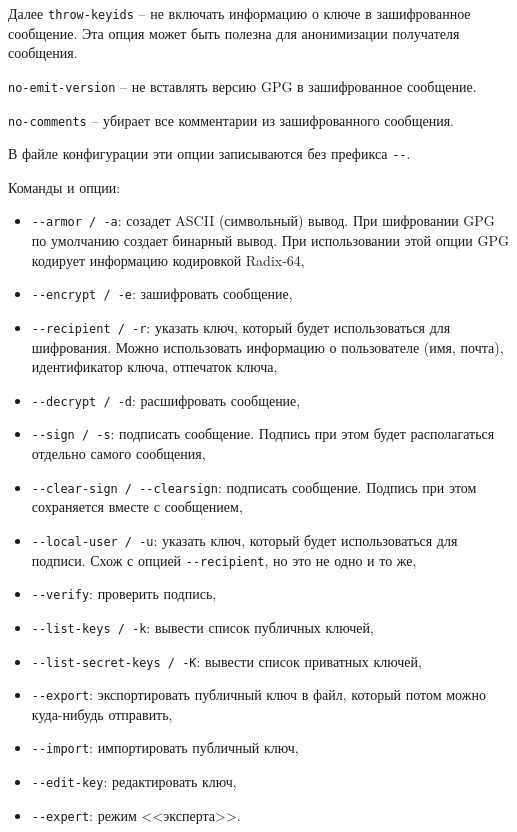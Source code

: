 \documentclass[%
	11pt,
	a4paper,
	utf8,
		]{article}
\begin{document}
Далее \texttt{throw-keyids} -- не включать информацию о ключе в зашифрованное сообщение. Эта опция может быть полезна для анонимизации получателя сообщения.

\texttt{no-emit-version} -- не вставлять версию GPG в зашифрованное сообщение.

\texttt{no-comments} -- убирает все комментарии из зашифрованного сообщения.

В файле конфигурации эти опции записываются без префикса \lstinline{--}.

Команды и опции:

\begin{itemize}
	\item \lstinline{--armor / -a}: созадет ASCII (символьный) вывод. При шифровании GPG по умолчанию создает бинарный вывод. При использовании этой опции GPG кодирует информацию кодировкой Radix-64,
	
	\item \lstinline{--encrypt / -e}: зашифровать сообщение,
	
	\item \lstinline{--recipient / -r}: указать ключ, который будет использоваться для шифрования. Можно использовать информацию о пользователе (имя, почта), идентификатор ключа, отпечаток ключа,
	
	\item \lstinline{--decrypt / -d}: расшифровать сообщение,
	
	\item \lstinline{--sign / -s}: подписать сообщение. Подпись при этом будет располагаться отдельно самого сообщения,
	
	\item \lstinline{--clear-sign / --clearsign}: подписать сообщение. Подпись при этом сохраняется вместе с сообщением,
	
	\item \lstinline{--local-user / -u}: указать ключ, который будет использоваться для подписи. Схож с опцией \lstinline{--recipient}, но это не одно и то же,
	
	\item \lstinline{--verify}: проверить подпись,
	
	\item \lstinline{--list-keys / -k}: вывести список публичных ключей,
	
	\item \lstinline{--list-secret-keys / -K}: вывести список приватных ключей,
	
	\item \lstinline{--export}: экспортировать публичный ключ в файл, который потом можно куда-нибудь отправить,
	
	\item \lstinline{--import}: импортировать публичный ключ,
	
	\item \lstinline{--edit-key}: редактировать ключ,
	
	\item \lstinline{--expert}: режим <<эксперта>>.  
\end{itemize}
\end{document}
